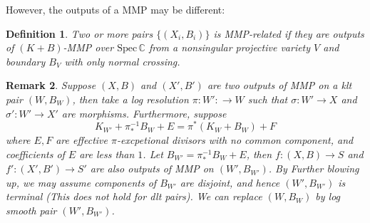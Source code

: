 \documentclass{article}
\newtheorem{defn}{Definition}[section]
\newtheorem{rmk}[defn]{Remark}
\begin{document}
However, the outputs of a MMP may be different:
\begin{defn}
  Two or more pairs $ \{(X_i,B_i)\} $ is MMP-related if they are outputs of $ (K+B) $-MMP over $ \mathrm{Spec}\,\mathbb{C} $ from a nonsingular  projective variety $ V $ and  boundary $ B_V $ with only normal crossing.
\end{defn}
\begin{rmk}
  Suppose $(X,B) $ and $ (X',B') $ are two  outputs of MMP on a klt pair $ (W,B_W) $, then take a log resolution $ \pi:W':\to W $ such that $ \sigma:W'\to X $ and $ \sigma':W'\to X' $ are morphisms. Furthermore, suppose
  $$ K_{W'}+\pi_*^{-1}B_W+E=\pi^*(K_W+B_W)+F $$
  where $ E,F $ are effective $ \pi $-excpetional divisors with no common component, and coefficients of $ E $ are less than $ 1 $. Let $ B_{W'}=\pi_*^{-1}B_W+E $, then $ f:(X,B)\to S $ and $ f':(X',B')\to S' $ are also  outputs of MMP on $ (W',B_{W'}) $. By Further blowing up, we may assume components of $ B_{W'} $ are disjoint, and hence $ (W',B_{W'}) $ is terminal (This does not hold for dlt pairs).  We can replace $ (W,B_W) $ by log smooth pair $ (W',B_{W'}) $.
\end{rmk}
\end{document}
